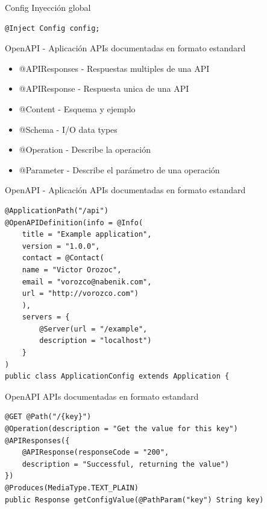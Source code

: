 \documentclass[aspectratio=169]{beamer}
\begin{document}
\begin{frame}[fragile]{Config}
Inyección global
\begin{lstlisting}
@Inject Config config;
\end{lstlisting}
\end{frame}

\begin{frame}[fragile]{OpenAPI - Aplicación}
APIs documentadas en formato estandard

\begin{itemize}
	\item @APIResponses - Respuestas multiples de una API
	\item @APIResponse - Respuesta unica de una API
	\item @Content - Esquema y ejemplo
	\item @Schema - I/O data types
	\item @Operation - Describe la operación
	\item @Parameter - Describe el parámetro de una operación
\end{itemize}

\end{frame}

\begin{frame}[fragile]{OpenAPI - Aplicación}
APIs documentadas en formato estandard
\begin{lstlisting}
@ApplicationPath("/api")
@OpenAPIDefinition(info = @Info(
    title = "Example application",
    version = "1.0.0",
    contact = @Contact(
    name = "Victor Orozoc",
    email = "vorozco@nabenik.com",
    url = "http://vorozco.com")
    ),
    servers = {
    	@Server(url = "/example",
    	description = "localhost")
    }
)
public class ApplicationConfig extends Application {
\end{lstlisting}
\end{frame}

\begin{frame}[fragile]{OpenAPI}
APIs documentadas en formato estandard
\begin{lstlisting}
@GET @Path("/{key}")
@Operation(description = "Get the value for this key")
@APIResponses({
    @APIResponse(responseCode = "200",
    description = "Successful, returning the value")
})
@Produces(MediaType.TEXT_PLAIN)
public Response getConfigValue(@PathParam("key") String key)
\end{lstlisting}
\end{frame}
\end{document}
